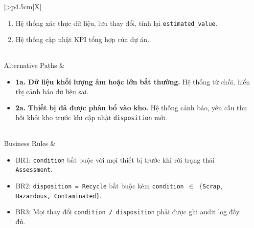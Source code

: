 \begin{xltabular}{\textwidth}{|>{\bfseries}p{4.5cm}|X|}
\begin{enumerate}[leftmargin=*, nosep]
        \item Hệ thống xác thực dữ liệu, lưu thay đổi, tính lại \texttt{estimated\_value}.
        \item Hệ thống cập nhật KPI tổng hợp của dự án.
    \end{enumerate} \\
    \hline
    Alternative Paths &
    \begin{itemize}[leftmargin=*, nosep]
        \item \textbf{1a. Dữ liệu khối lượng âm hoặc lớn bất thường.} Hệ thống từ chối, hiển thị cảnh báo dữ liệu sai.
        \item \textbf{2a. Thiết bị đã được phân bổ vào kho.} Hệ thống cảnh báo, yêu cầu thu hồi khỏi kho trước khi cập nhật \texttt{disposition} mới.
    \end{itemize} \\
    \hline
    Business Rules &
    \begin{itemize}[leftmargin=*, nosep]
        \item BR1: \texttt{condition} bắt buộc với mọi thiết bị trước khi rời trạng thái \texttt{Assessment}.
        \item BR2: \texttt{disposition = Recycle} bắt buộc kèm \texttt{condition $\in$ \{Scrap, Hazardous, Contaminated\}}.
        \item BR3: Mọi thay đổi \texttt{condition / disposition} phải được ghi audit log đầy đủ.
    \end{itemize} \\
    \hline
    \caption{Đặc tả Use Case: Đánh giá thiết bị trong dự án} \\
\end{xltabular}

